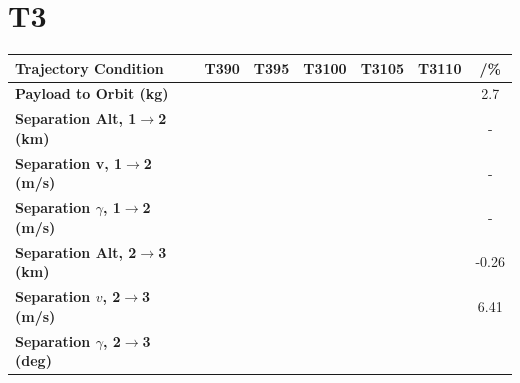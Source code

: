 \section{T3}
\begin{table}[ht]
	\centering
	\begin{tabular}{l c c c c c c} 
		\hline \textbf{Trajectory Condition}
		&T390
		&T395
		&T3100
		&T3105
		&T3110
		& /\%
		\\
		\hline \textbf{Payload to Orbit (kg)}
		& \PayloadToOrbitTThreeNinety
		& \PayloadToOrbitTThreeNinetyFive
		& \PayloadToOrbitTThreeStandard
		& \PayloadToOrbitTThreeOneHundredFive
		& \PayloadToOrbitTThreeOneHundredTen
		&2.7
		\\
		\textbf{Separation Alt, 1$\rightarrow$2 (km)}
		& \firstsecondSeparationAltTThreeNinety
		& \firstsecondSeparationAltTThreeNinetyFive
		& \firstsecondSeparationAltTThreeStandard
		& \firstsecondSeparationAltTThreeOneHundredFive
		& \firstsecondSeparationAltTThreeOneHundredTen
		& -
		\\
		\textbf{Separation v, 1$\rightarrow$2 (m/s)}
		& \firstsecondSeparationvTThreeNinety
		& \firstsecondSeparationvTThreeNinetyFive
		& \firstsecondSeparationvTThreeStandard
		& \firstsecondSeparationvTThreeOneHundredFive
		& \firstsecondSeparationvTThreeOneHundredTen
		& -
		\\
		\textbf{Separation $\gamma$, 1$\rightarrow$2 (m/s)}
		& \firstsecondSeparationgammaTThreeNinety
		& \firstsecondSeparationgammaTThreeNinetyFive
		& \firstsecondSeparationgammaTThreeStandard
		& \firstsecondSeparationgammaTThreeOneHundredFive
		& \firstsecondSeparationgammaTThreeOneHundredTen
		& -
		\\
		\textbf{Separation Alt, 2$\rightarrow$3 (km)}
		& \secondthirdSeparationAltTThreeNinety
		& \secondthirdSeparationAltTThreeNinetyFive
		& \secondthirdSeparationAltTThreeStandard
		& \secondthirdSeparationAltTThreeOneHundredFive
		& \secondthirdSeparationAltTThreeOneHundredTen
		&-0.26
		\\
		\textbf{Separation $v$, 2$\rightarrow$3 (m/s)}
		& \secondthirdSeparationvTThreeNinety
		& \secondthirdSeparationvTThreeNinetyFive
		& \secondthirdSeparationvTThreeStandard
		& \secondthirdSeparationvTThreeOneHundredFive
		& \secondthirdSeparationvTThreeOneHundredTen
		&6.41
		\\
		\textbf{Separation $\gamma$, 2$\rightarrow$3 (deg)}
		& \secondthirdSeparationgammaTThreeNinety
		& \secondthirdSeparationgammaTThreeNinetyFive
		& \secondthirdSeparationgammaTThreeStandard
		& \secondthirdSeparationgammaTThreeOneHundredFive

\end{tabular}
\end{table}
